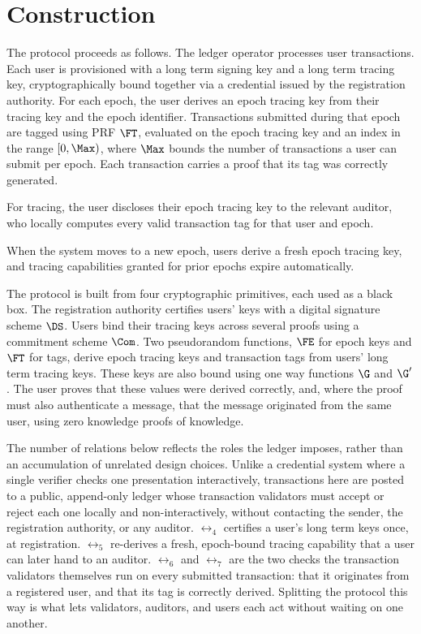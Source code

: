 \section{Construction}\label{sec:txid-construction}

The protocol proceeds as follows. The ledger operator processes user
transactions. Each user is provisioned with a long term signing key and a long
term tracing key, cryptographically bound together via a credential issued by
the registration authority. For each epoch, the user derives an epoch tracing
key from their tracing key and the epoch identifier. Transactions submitted
during that epoch are tagged using PRF $\FT$, evaluated on the epoch tracing
key and an index in the range $[0,\Max)$, where $\Max$ bounds the number of
transactions a user can submit per epoch. Each transaction carries a proof that
its tag was correctly generated.

For tracing, the user discloses their epoch tracing key to the relevant
auditor, who locally computes every valid transaction tag for that user and
epoch.

When the system moves to a new epoch, users derive a fresh epoch tracing key,
and tracing capabilities granted for prior epochs expire automatically.

The protocol is built from four cryptographic primitives, each used as a black
box. The registration authority certifies users' keys with a digital signature scheme $\DS$.
Users bind their tracing keys across several
proofs using a commitment scheme $\Com$. Two pseudorandom
functions, $\FE$ for epoch keys and $\FT$ for tags, derive epoch tracing keys and transaction tags from users'
long term tracing keys. These keys are also bound using one way
functions $\G$ and $\G'$. The user proves that these values were derived
correctly, and, where the proof must also authenticate a message, that the
message originated from the same user, using zero knowledge proofs of knowledge.

The number of relations below reflects the roles the ledger imposes, rather
than an accumulation of unrelated design choices. Unlike a credential system
where a single verifier checks one presentation interactively, transactions
here are posted to a public, append-only ledger whose transaction validators
must accept or reject each one locally and non-interactively, without
contacting the sender, the registration authority, or any auditor. $\rel_4$
certifies a user's long term keys once, at registration. $\rel_5$ re-derives a
fresh, epoch-bound tracing capability that a user can later hand to an auditor.
$\rel_6$ and $\rel_7$ are the two checks the transaction validators themselves
run on every submitted transaction: that it originates from a registered user,
and that its tag is correctly derived. Splitting the protocol this way is what
lets validators, auditors, and users each act without waiting on one another.

